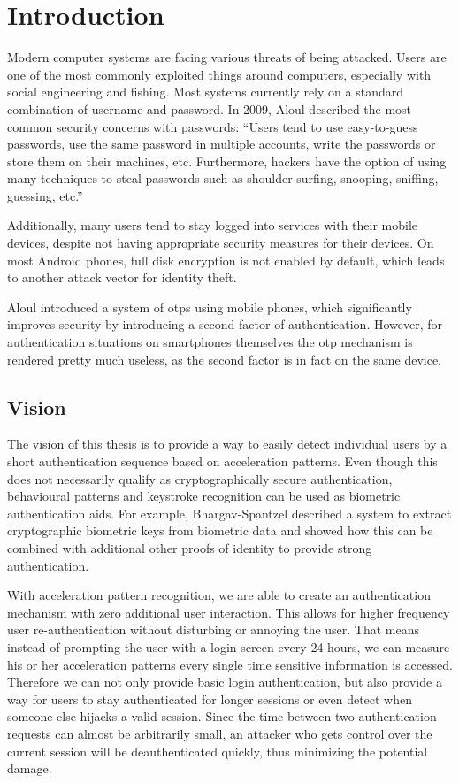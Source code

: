 \chapter{Introduction}\label{chapter:introduction}
Modern computer systems are facing various threats of being attacked. Users are one of the most commonly exploited things around computers, especially with social engineering and fishing. Most systems currently rely on a standard combination of username and password. In 2009, Aloul \etal described the most common security concerns with passwords\cite{aloul2009two}:
``Users tend to use easy-to-guess passwords, use the same password in multiple accounts, write the passwords or store them on their machines, etc. Furthermore, hackers have the option of using many techniques to steal passwords such as shoulder surfing, snooping, sniffing, guessing, etc.''

Additionally, many users tend to stay logged into services with their mobile devices, despite not having appropriate security measures for their devices. On most Android phones, full disk encryption is not enabled by default, which leads to another attack vector for identity theft.

Aloul \etal introduced a system of \glspl{otp} using mobile phones, which significantly improves security by introducing a second factor of authentication. However, for authentication situations on smartphones themselves the \gls{otp} mechanism is rendered pretty much useless, as the second factor is in fact on the same device.

\section{Vision}
The vision of this thesis is to provide a way to easily detect individual users by a short authentication sequence based on acceleration patterns. Even though this does not necessarily qualify as cryptographically secure authentication, behavioural patterns and keystroke recognition can be used as biometric authentication aids. For example, Bhargav-Spantzel \etal \cite{bhargav2006privacy} described a system to extract cryptographic biometric keys from biometric data and showed how this can be combined with additional other proofs of identity to provide strong authentication.

With acceleration pattern recognition, we are able to create an authentication mechanism with zero additional user interaction. This allows for higher frequency user re-authentication without disturbing or annoying the user. That means instead of prompting the user with a login screen every 24 hours, we can measure his or her acceleration patterns every single time sensitive information is accessed. Therefore we can not only provide basic login authentication, but also provide a way for users to stay authenticated for longer sessions or even detect when someone else hijacks a valid session. Since the time between two authentication requests can almost be arbitrarily small, an attacker who gets control over the current session will be deauthenticated quickly, thus minimizing the potential damage.
